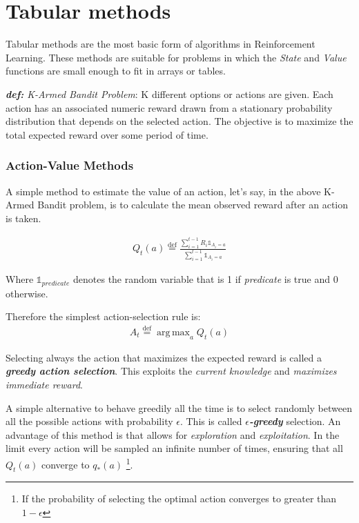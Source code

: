 \documentclass[paper=a4,fontsize=11pt]{scrartcl} %
\numberwithin{equation}{section} %
\numberwithin{figure}{section} %
\numberwithin{table}{section} %
\newcommand{\eqdef}{\stackrel{\text{def}}{=}}
\DeclareMathOperator*{\argmax}{arg\,max}
\begin{document}
\section{Tabular methods}

Tabular methods are the most basic form of algorithms in Reinforcement Learning. 
These methods are suitable for problems in which the \textit{State} and \textit{Value} functions
are small enough to fit in arrays or tables.
\newline

\textit{\textbf{def:} K-Armed Bandit Problem}: \newline
K different options or actions are given. Each action has an associated numeric reward drawn from a
stationary probability distribution that depends on the selected action.
The objective is to maximize the total expected reward over some period of time.


\subsubsection{Action-Value Methods}

A simple method to estimate the value of an action, let's say, in the above K-Armed Bandit problem, is to 
calculate the mean observed reward after an action is taken.

\begin{align}
Q_t(a) \eqdef \frac{\sum_{i=1}^{t-1} R_i \mathds{1}_{A_i=a}}{\sum_{i=1}^{t-1} \mathds{1}_{A_i=a}}	\label{eq:value function}
\end{align}

Where $ \mathds{1}_{predicate} $ denotes the random variable that is 1 if \textit{predicate} is true
and 0 otherwise.

Therefore the simplest action-selection rule is:
\begin{align}
A_t \eqdef \argmax_a Q_t(a)
\end{align}

Selecting always the action that maximizes the expected reward is called a \textit{\textbf{greedy action selection}}.
This exploits the \textit{current knowledge} and \textit{maximizes immediate reward}.

A simple alternative to behave greedily all the time is to select randomly between all the possible actions with 
probability $\epsilon$.
This is called \textit{\textbf{$\epsilon$-greedy}} selection.
An advantage of this method is that allows for \textit{exploration} and \textit{exploitation}. In the limit
every action will be sampled an infinite number of times, ensuring that all $Q_t(a)$ converge to $q_*(a)$ 
\footnote{If the probability of selecting the optimal action converges to greater than $1 - \epsilon$}.
\end{document}
